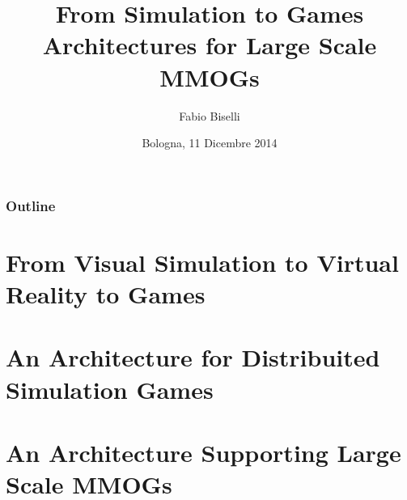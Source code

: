 \documentclass{beamer}
\title[From Simulation to Games: Architectures for Large Scale MMOGs]{From Simulation to Games \\
Architectures for Large Scale MMOGs}
\author[Fabio Biselli]{Fabio Biselli}
\institute{%
  {\large Universit\`a di Bologna} \\
  {\large Laurea Magistrale in Informatica} \\
  Corso di Simulazione di Sistemi }
\date{Bologna, 11 Dicembre 2014}
\begin{document}
\begin{frame}
  \titlepage
\end{frame}

\begin{frame}%
\frametitle{Outline} \tableofcontents
\end{frame}

\section{From Visual Simulation to Virtual Reality to Games}



\section{An Architecture for Distribuited Simulation Games}



\section{An Architecture Supporting Large Scale MMOGs}


\end{document}
